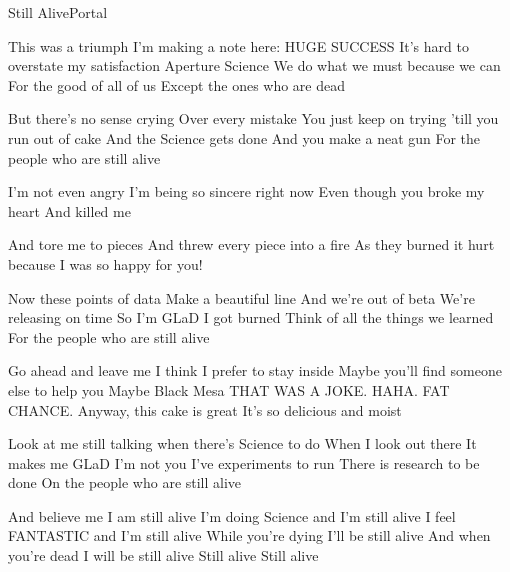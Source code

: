 \documentclass[a4paper,11pt,french]{article}
\begin{document}
\begin{Song}{Still Alive}{Portal}
\begin{multicols}{2}
\begin{Verse}
This was a triumph
I'm making a note here: HUGE SUCCESS
It's hard to overstate my satisfaction
Aperture Science
We do what we must because we can
For the good of all of us
Except the ones who are dead
\end{Verse}
\espaceInterStrophe

\begin{Chorus}
But there's no sense crying 
Over every mistake
You just keep on trying 
'till you run out of cake
And the Science gets done
And you make a neat gun
For the people who are still alive
\end{Chorus}
\espaceInterStrophe

\begin{Verse}
I'm not even angry
I'm being so sincere right now
Even though you broke my heart
And killed me

And tore me to pieces
And threw every piece into a fire
As they burned it hurt because 
I was so happy for you!
\end{Verse}
\espaceInterStrophe

\begin{Chorus}
Now these points of data 
Make a beautiful line
And we're out of beta
We're releasing on time
So I'm GLaD I got burned
Think of all the things we learned
For the people who are still alive
\end{Chorus}
\columnbreak

\begin{Verse}
Go ahead and leave me
I think I prefer to stay inside
Maybe you'll find someone else to help you
Maybe Black Mesa
THAT WAS A JOKE. HAHA. FAT CHANCE.
Anyway, this cake is great
It's so delicious and moist
\end{Verse}
\espaceInterStrophe

\begin{Chorus}
Look at me still talking
when there's Science to do
When I look out there
It makes me GLaD I'm not you
I've experiments to run
There is research to be done
On the people who are still alive
\espaceInterStrophe

And believe me I am still alive
I'm doing Science and I'm still alive
I feel FANTASTIC and I'm still alive
While you're dying I'll be still alive
And when you're dead I will be still alive
Still alive
Still alive
\end{Chorus}


\end{multicols}
\end{Song}
\end{document}
